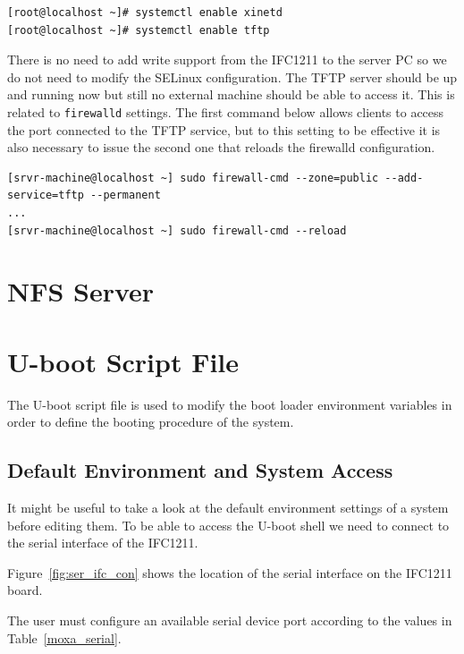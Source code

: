 \documentclass[11pt
  , a4paper
  , article
  , oneside
  , showtrims
]{memoir}
\begin{document}
\begin{lstlisting}[style=termstyle]
[root@localhost ~]# systemctl enable xinetd
[root@localhost ~]# systemctl enable tftp
\end{lstlisting}

There is no need to add write support from the IFC1211 to the server PC so we do not need to modify the SELinux configuration.
The TFTP server should be up and running now but still no external machine should be able to access it. This is related to \texttt{firewalld} settings. 
The first command below allows clients to access the port connected to the TFTP service, but to this setting to be effective it is also necessary to issue the second one that reloads the firewalld configuration.

\begin{lstlisting}[style=termstyle]
[srvr-machine@localhost ~] sudo firewall-cmd --zone=public --add-service=tftp --permanent
...
[srvr-machine@localhost ~] sudo firewall-cmd --reload
\end{lstlisting}


\section{NFS Server}
\fi

\section{U-boot Script File}
The U-boot script file is used to modify the boot loader environment variables in order to define the booting procedure of the system.

\subsection{Default Environment and System Access}
It might be useful to take a look at the default environment settings of a system before editing them. To be able to access the U-boot shell we need to connect to the serial interface of the IFC1211.

Figure~\ref{fig:ser_ifc_con} shows the location of the serial interface on the IFC1211 board.

The user must configure an available serial device port according to the values in Table~\ref{moxa_serial}.
\end{document}
